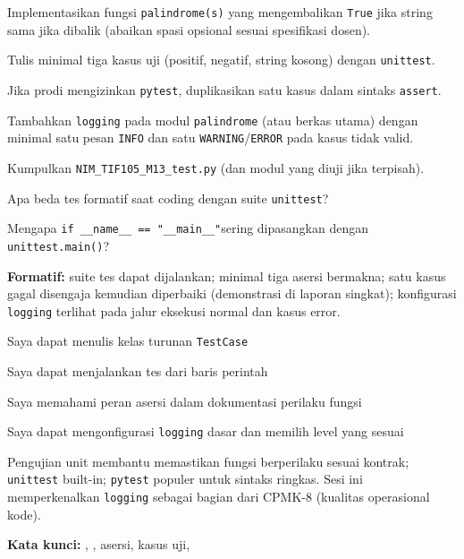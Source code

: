 \documentclass[../main.tex]{subfiles}
\begin{document}
\begin{aktivitas}
  \item Implementasikan fungsi \texttt{palindrome(s)} yang mengembalikan \texttt{True} jika string sama jika dibalik (abaikan spasi opsional sesuai spesifikasi dosen).
  \item Tulis minimal tiga kasus uji (positif, negatif, string kosong) dengan \texttt{unittest}.
  \item Jika prodi mengizinkan \texttt{pytest}, duplikasikan satu kasus dalam sintaks \texttt{assert}.
  \item Tambahkan \texttt{logging} pada modul \texttt{palindrome} (atau berkas utama) dengan minimal satu pesan \texttt{INFO} dan satu \texttt{WARNING}/\texttt{ERROR} pada kasus tidak valid.
  \item Kumpulkan \texttt{NIM\_TIF105\_M13\_test.py} (dan modul yang diuji jika terpisah).
\end{aktivitas}

\begin{latihan}
  \item Apa beda tes formatif saat coding dengan suite \texttt{unittest}?
  \item Mengapa \texttt{if \_\_name\_\_ == "\_\_main\_\_"}\newline sering dipasangkan dengan \texttt{unittest.main()}?
\end{latihan}

\begin{asesmen}
\textbf{Formatif:} suite tes dapat dijalankan; minimal tiga asersi bermakna; satu kasus gagal disengaja kemudian diperbaiki (demonstrasi di laporan singkat); konfigurasi \texttt{logging} terlihat pada jalur eksekusi normal dan kasus error.
\end{asesmen}

\begin{checklist}
  \item Saya dapat menulis kelas turunan \texttt{TestCase}
  \item Saya dapat menjalankan tes dari baris perintah
  \item Saya memahami peran asersi dalam dokumentasi perilaku fungsi
  \item Saya dapat mengonfigurasi \texttt{logging} dasar dan memilih level yang sesuai
\end{checklist}

\begin{rangkuman}
Pengujian unit membantu memastikan fungsi berperilaku sesuai kontrak; \texttt{unittest} built-in; \texttt{pytest} populer untuk sintaks ringkas. Sesi ini memperkenalkan \texttt{logging} sebagai bagian dari CPMK-8 (kualitas operasional kode).

\textbf{Kata kunci:} , , asersi, kasus uji, 
\end{rangkuman}
\end{document}
